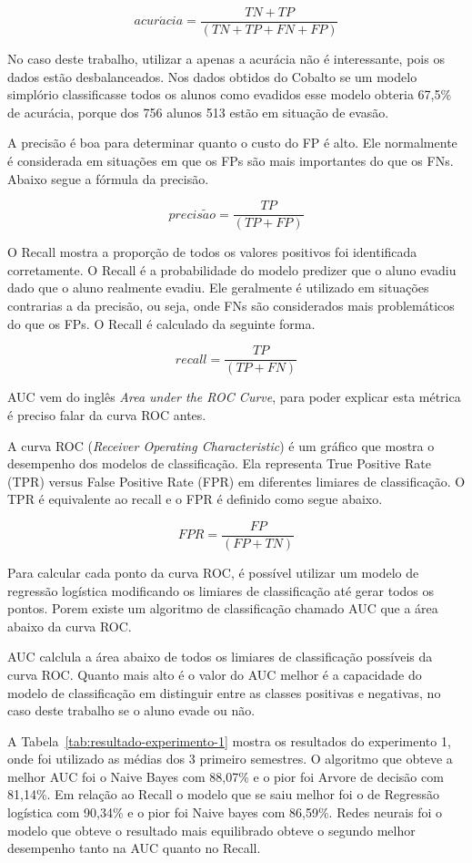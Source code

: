 \documentclass[diss,capa]{texufpel}
\begin{document}
\[acur\acute{a}cia = \frac{TN + TP}{(TN + TP + FN + FP)}\]

No caso deste trabalho, utilizar a apenas a acurácia não é interessante, pois os dados estão desbalanceados. 
Nos dados obtidos do Cobalto se um modelo simplório classificasse todos os alunos como evadidos esse modelo obteria 67,5\% de acurácia, porque dos 756 alunos 513 estão em situação de evasão.

A precisão é boa para determinar quanto o custo do FP é alto.
Ele normalmente é considerada em situações em que os FPs são mais importantes do que os FNs.
Abaixo segue a fórmula da precisão.

\[precis\tilde{a}o = \frac{TP}{(TP + FP)}\]

O Recall mostra a proporção de todos os valores positivos foi identificada corretamente.
O Recall é a probabilidade do modelo predizer que o aluno evadiu dado que o aluno realmente evadiu.
Ele geralmente é utilizado em situações contrarias a da precisão, ou seja, onde FNs são considerados mais problemáticos do que os FPs.
O Recall é calculado da seguinte forma.

\[recall = \frac{TP}{(TP + FN)}\]

AUC vem do inglês \textit{Area under the ROC Curve}, para poder explicar esta métrica é preciso falar da curva ROC antes.

A curva ROC (\textit{Receiver Operating Characteristic}) é um gráfico que mostra o desempenho dos modelos de classificação.
Ela representa True Positive Rate (TPR) versus False Positive Rate (FPR) em diferentes limiares de classificação.
O TPR é equivalente ao recall e o FPR é definido como segue abaixo.

\[FPR = \frac{FP}{(FP + TN)}\]

Para calcular cada ponto da curva ROC, é possível utilizar um modelo de regressão logística modificando os limiares de classificação até gerar todos os pontos. Porem existe um algoritmo de classificação chamado AUC que a área abaixo da curva ROC.

AUC calclula a área abaixo de todos os limiares de classificação possíveis da curva ROC. Quanto mais alto é o valor do AUC melhor é a capacidade do modelo de classificação em distinguir entre as classes positivas e negativas, no caso deste trabalho se o aluno evade ou não.


A Tabela~\ref{tab:resultado-experimento-1} mostra os resultados do experimento 1, onde foi utilizado as médias dos 3 primeiro semestres.
O algoritmo que obteve a melhor AUC foi o Naive Bayes com 88,07\% e o pior foi Arvore de decisão com 81,14\%.
Em relação ao Recall o modelo que se saiu melhor foi o de Regressão logística com 90,34\% e o pior foi Naive bayes com 86,59\%. Redes neurais foi o modelo que obteve o resultado mais equilibrado obteve o segundo melhor desempenho tanto na AUC quanto no Recall.
\end{document}
